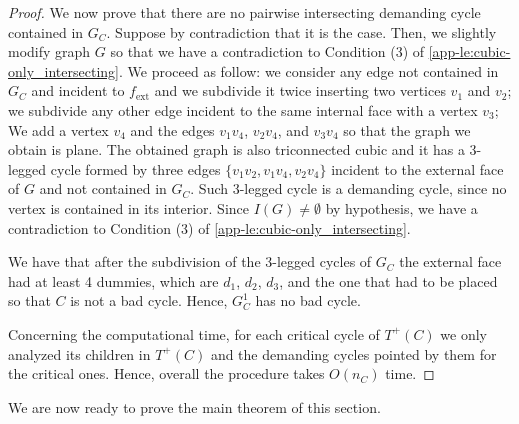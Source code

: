 \documentclass[runningheads]{llncs}
\newcommand{\ext}{\operatorname{ext}}
\begin{document}
\begin{proof}
We now prove that there are no pairwise intersecting demanding cycle contained in $G_C$. Suppose by contradiction that it is the case. Then, we slightly modify graph $G$ so that we have a contradiction to Condition (3) of \cref{app-le:cubic-only_intersecting}. We proceed as follow: we consider any edge not contained in $G_C$ and incident to $f_{\ext}$ and we subdivide it twice inserting two vertices $v_1$ and $v_2$; we subdivide any other edge incident to the same internal face with a vertex $v_3$; We add a vertex $v_4$ and the edges $v_1v_4$, $v_2v_4$, and $v_3v_4$ so that the graph we obtain is plane. The obtained graph is also triconnected cubic and it has a 3-legged cycle formed by three edges $\{v_1v_2, v_1v_4,v_2v_4\}$ incident to the external face of $G$ and not contained in $G_C$. Such 3-legged cycle is a demanding cycle, since no vertex is contained in its interior. Since $I(G)\not=\emptyset$ by hypothesis, we have a contradiction to Condition (3) of \cref{app-le:cubic-only_intersecting}. 

We have that after the subdivision of the 3-legged cycles of $G_C$ the external face had at least 4 dummies, which are $d_1$, $d_2$, $d_3$, and the one that had to be placed so that $C$ is not a bad cycle.  Hence, $G^1_C$ has no bad cycle. 

\smallskip
Concerning the computational time, for each critical cycle of $T^+(C)$ we only analyzed its children in $T^+(C)$ and the demanding cycles pointed by them for the critical ones. Hence, overall the procedure takes $O(n_C)$ time.
\end{proof}

We are now ready to prove the main theorem of this section.

\minbendcubic*
\label{app-th:minbend-cubic*}
\end{document}
